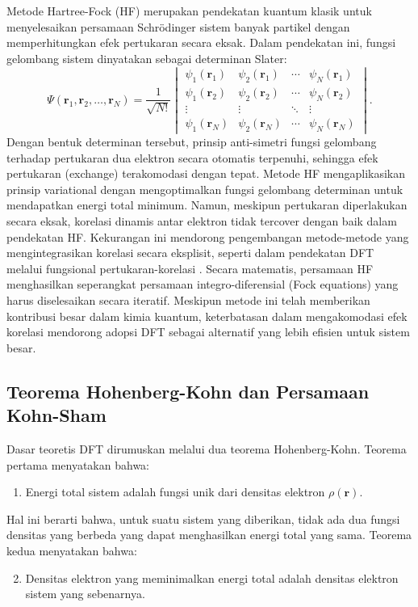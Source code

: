Metode Hartree-Fock (HF) merupakan pendekatan kuantum klasik untuk menyelesaikan persamaan Schrödinger sistem banyak partikel dengan memperhitungkan efek pertukaran secara eksak. Dalam pendekatan ini, fungsi gelombang sistem dinyatakan sebagai determinan Slater:
\begin{equation}
    \Psi(\mathbf{r}_1,\mathbf{r}_2,\ldots,\mathbf{r}_N) = \frac{1}{\sqrt{N!}}
    \begin{vmatrix}
    \psi_1(\mathbf{r}_1) & \psi_2(\mathbf{r}_1) & \cdots & \psi_N(\mathbf{r}_1) \\
    \psi_1(\mathbf{r}_2) & \psi_2(\mathbf{r}_2) & \cdots & \psi_N(\mathbf{r}_2) \\
    \vdots & \vdots & \ddots & \vdots \\
    \psi_1(\mathbf{r}_N) & \psi_2(\mathbf{r}_N) & \cdots & \psi_N(\mathbf{r}_N)
    \end{vmatrix}.
 \end{equation}
Dengan bentuk determinan tersebut, prinsip anti-simetri fungsi gelombang terhadap pertukaran dua elektron secara otomatis terpenuhi, sehingga efek pertukaran (exchange) terakomodasi dengan tepat. Metode HF mengaplikasikan prinsip variational dengan mengoptimalkan fungsi gelombang determinan untuk mendapatkan energi total minimum. Namun, meskipun pertukaran diperlakukan secara eksak, korelasi dinamis antar elektron tidak tercover dengan baik dalam pendekatan HF. Kekurangan ini mendorong pengembangan metode-metode yang mengintegrasikan korelasi secara eksplisit, seperti dalam pendekatan DFT melalui fungsional pertukaran-korelasi \citep{Martin2004}. Secara matematis, persamaan HF menghasilkan seperangkat persamaan integro-diferensial (Fock equations) yang harus diselesaikan secara iteratif. Meskipun metode ini telah memberikan kontribusi besar dalam kimia kuantum, keterbatasan dalam mengakomodasi efek korelasi mendorong adopsi DFT sebagai alternatif yang lebih efisien untuk sistem besar. \subsection{Teorema Hohenberg-Kohn dan Persamaan Kohn-Sham}
Dasar teoretis DFT dirumuskan melalui dua teorema Hohenberg-Kohn. Teorema pertama menyatakan bahwa:
\begin{enumerate}
    \item Energi total sistem adalah fungsi unik dari densitas elektron \(\rho(\mathbf{r})\). \end{enumerate}
Hal ini berarti bahwa, untuk suatu sistem yang diberikan, tidak ada dua fungsi densitas yang berbeda yang dapat menghasilkan energi total yang sama. Teorema kedua menyatakan bahwa:
\begin{enumerate}
    \setcounter{enumi}{1}
    \item Densitas elektron yang meminimalkan energi total adalah densitas elektron sistem yang sebenarnya. \end{enumerate}

